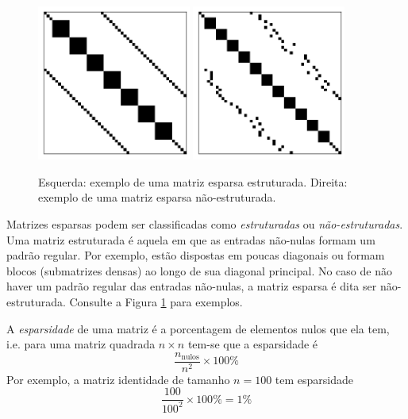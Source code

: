 \begin{figure}[H]
  \centering
  \includegraphics[width=0.45\textwidth]{./cap_sislin/dados/matriz_esparsa_estruturada/main}
  \includegraphics[width=0.45\textwidth]{./cap_sislin/dados/matriz_esparsa_nao_estruturada/main}
  \caption{Esquerda: exemplo de uma matriz esparsa estruturada. Direita: exemplo de uma matriz esparsa não-estruturada.}
  \label{fig:ex_matriz_esparsa_estrutura}
\end{figure}

Matrizes esparsas podem ser classificadas como \emph{estruturadas} ou \emph{não-estruturadas}. Uma matriz estruturada é aquela em que as entradas não-nulas formam um padrão regular. Por exemplo, estão dispostas em poucas diagonais ou formam blocos (submatrizes densas) ao longo de sua diagonal principal. No caso de não haver um padrão regular das entradas não-nulas, a matriz esparsa é dita ser não-estruturada. Consulte a Figura \ref{fig:ex_matriz_esparsa_estrutura} para exemplos.

A \emph{esparsidade} de uma matriz é a porcentagem de elementos nulos que ela tem, i.e. para uma matriz quadrada $n\times n$ tem-se que a esparsidade é
\begin{equation}
  \frac{n_{\text{nulos}}}{n^2}\times 100\%
\end{equation}
Por exemplo, a matriz identidade de tamanho $n=100$ tem esparsidade
\begin{equation}
  \frac{100}{100^2}\times 100\% = 1\% 
\end{equation}

